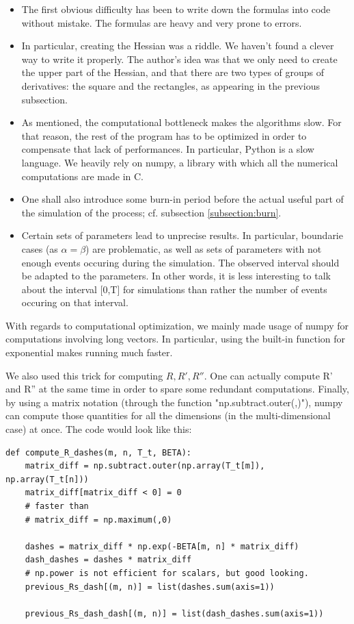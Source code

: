\documentclass[11pt]{book}
\begin{document}
\begin{itemize}
\item The first obvious difficulty has been to write down the formulas into code without mistake. The formulas are heavy and very prone to errors.
\item In particular, creating the Hessian was a riddle. We haven't found a clever way to write it properly. The author's idea was that we only need to create the upper part of the Hessian, and that there are two types of groups of derivatives: the square and the rectangles, as appearing in the previous subsection.
\item As mentioned, the computational bottleneck makes the algorithms slow. For that reason, the rest of the program has to be optimized in order to compensate that lack of performances. In particular, Python is a slow language. We heavily rely on numpy, a library with which all the numerical computations are made in C.
\item One shall also introduce some burn-in period before the actual useful part of the simulation of the process; cf. subsection \ref{subsection:burn}.
\item Certain sets of parameters lead to unprecise results. In particular, boundarie cases (as $\alpha = \beta$) are problematic, as well as sets of parameters with not enough events occuring during the simulation. The observed interval should be adapted to the parameters. In other words, it is less interesting to talk about the interval [0,T] for simulations than rather the number of events occuring on that interval.
\end{itemize}

With regards to computational optimization, we mainly made usage of numpy for computations involving long vectors. In particular, using the built-in function for exponential makes running much faster. 

We also used this trick for computing $R,R',R''$. One can actually compute R' and R'' at the same time in order to spare some redundant computations. Finally, by using a matrix notation (through the function "np.subtract.outer(,)"), numpy can compute those quantities for all the dimensions (in the multi-dimensional case) at once. The code would look like this:

\begin{verbatim}
def compute_R_dashes(m, n, T_t, BETA):
    matrix_diff = np.subtract.outer(np.array(T_t[m]), np.array(T_t[n]))
    matrix_diff[matrix_diff < 0] = 0
    # faster than
    # matrix_diff = np.maximum(,0)

    dashes = matrix_diff * np.exp(-BETA[m, n] * matrix_diff)
    dash_dashes = dashes * matrix_diff
    # np.power is not efficient for scalars, but good looking.
    previous_Rs_dash[(m, n)] = list(dashes.sum(axis=1))

    previous_Rs_dash_dash[(m, n)] = list(dash_dashes.sum(axis=1))
\end{verbatim}
\end{document}
